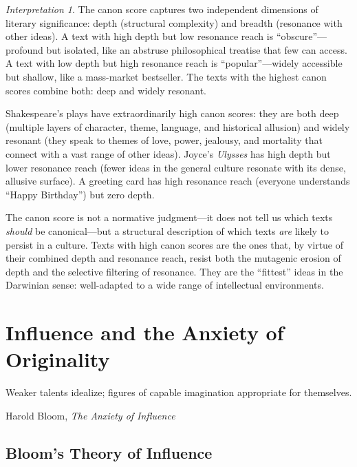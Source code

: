 \documentclass[11pt,openany]{book}
\theoremstyle{definition}
\theoremstyle{plain}
\theoremstyle{remark}
\newtheorem{interpretation}[axiom]{Interpretation}
\begin{document}
\begin{interpretation}
The canon score captures two independent dimensions of literary significance: depth (structural complexity) and breadth (resonance with other ideas). A text with high depth but low resonance reach is ``obscure''---profound but isolated, like an abstruse philosophical treatise that few can access. A text with low depth but high resonance reach is ``popular''---widely accessible but shallow, like a mass-market bestseller. The texts with the highest canon scores combine both: deep and widely resonant.

Shakespeare's plays have extraordinarily high canon scores: they are both deep (multiple layers of character, theme, language, and historical allusion) and widely resonant (they speak to themes of love, power, jealousy, and mortality that connect with a vast range of other ideas). Joyce's \emph{Ulysses} has high depth but lower resonance reach (fewer ideas in the general culture resonate with its dense, allusive surface). A greeting card has high resonance reach (everyone understands ``Happy Birthday'') but zero depth.

The canon score is not a normative judgment---it does not tell us which texts \emph{should} be canonical---but a structural description of which texts \emph{are} likely to persist in a culture. Texts with high canon scores are the ones that, by virtue of their combined depth and resonance reach, resist both the mutagenic erosion of depth and the selective filtering of resonance. They are the ``fittest'' ideas in the Darwinian sense: well-adapted to a wide range of intellectual environments.
\end{interpretation}


\chapter{Influence and the Anxiety of Originality}
\label{ch:influence}

\epigraph{Weaker talents idealize; figures of capable imagination appropriate for themselves.}{Harold Bloom, \textit{The Anxiety of Influence}}

\section{Bloom's Theory of Influence}
\end{document}
